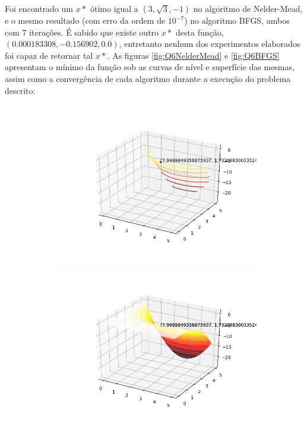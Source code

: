 \documentclass[a4paper, 12pt]{article}
\begin{document}
Foi encontrado um $x*$ ótimo igual a $(3, \sqrt{3},-1)$ no algoritmo de Nelder-Mead, e o mesmo resultado (com erro da ordem de $10^{-7}$) no algoritmo BFGS, ambos com 7 iterações. É sabido que existe outro $x*$  desta função, $(0.000183308, -0.156902, 0.0)$, entretanto nenhum dos experimentos elaborados foi capaz de retornar tal $x*$.
As figuras \ref{fig:Q6NelderMead} e \ref{fig:Q6BFGS} apresentam o mínimo da função sob as curvas de nível e superfície das mesmas, assim como a convergência de cada algoritmo durante a execução do problema descrito:

\begin{figure}[H]
\centering
\begin{subfigure}{0.3\textwidth}
  \centering
  \includegraphics[width=\linewidth]{6/Nelder-Mead/contorno.png}
\end{subfigure}%
\begin{subfigure}{0.3\textwidth}
  \centering
  \includegraphics[width=\linewidth]{6/Nelder-Mead/superficie.png}

\end{subfigure}
\end{figure}
\end{document}
